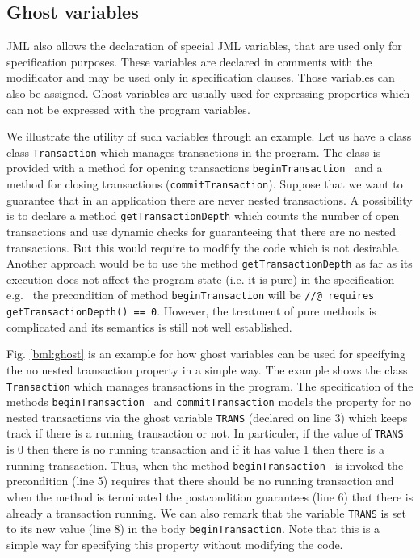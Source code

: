 \subsection{Ghost variables}\label{javaVerif:JML:ghost} 
 JML also allows the declaration of special JML variables, that are used only for specification purposes. 
 These variables are declared in comments with the  modificator and may be used only in specification clauses. Those variables 
 can also be assigned. Ghost variables are usually used  for expressing properties which can not be expressed with the program variables.

 We illustrate the utility of such variables through an example. 
 Let us have a class class \texttt{Transaction}  which manages transactions in the program.  
 The class is provided with a method for opening transactions \texttt{beginTransaction } and 
 a method for closing transactions (\texttt{commitTransaction}). Suppose that we want to guarantee that in an application 
 there are never nested transactions. A possibility is to declare a method \texttt{getTransactionDepth} which counts the number
 of open transactions and use dynamic checks  for guaranteeing that there are no nested transactions. But this would require to modfify the code which is not desirable. 
Another approach would be to use the method  \texttt{getTransactionDepth}  as far as its execution
 does not affect the program state (i.e. it is pure) in the specification 
 e.g. \ the precondition  of method \texttt{beginTransaction} will be \texttt{//@ requires getTransactionDepth() == 0}.
However,  the treatment of pure methods is  complicated and its semantics is still not well established.
 
 Fig. \ref{bml:ghost} is an example for how ghost variables can be used for specifying the no nested transaction property in a simple way.
 The example shows the class \texttt{Transaction} which manages transactions in the program. 
  The specification of the methods \texttt{beginTransaction } and \texttt{commitTransaction}
 models the property for no nested transactions via the ghost variable
 \texttt{TRANS} (declared on line 3) which keeps track if there is  a running transaction or not. In particuler, 
 if the value of  \texttt{TRANS} is 0 then there is no running transaction and if it has value 1 then there is
 a running transaction.  Thus, when the method  \texttt{beginTransaction } is invoked the precondition (line 5) requires
 that there should be no running transaction and when the method is terminated the postcondition guarantees (line 6) that there is already a transaction running.
 We can also remark that the variable  \texttt{TRANS} is set to its new value (line 8) in the  body  \texttt{beginTransaction}.
Note that this is a simple way for specifying this property without modifying the code. 

